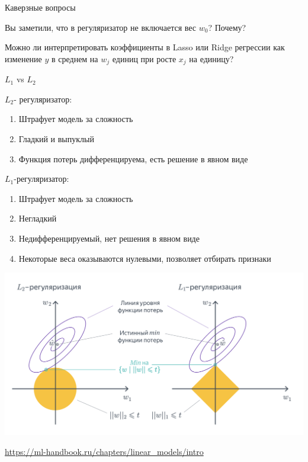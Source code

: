 \documentclass[notes,12pt, aspectratio=169]{beamer}
\newenvironment{wideitemize}{\itemize\addtolength{\itemsep}{10pt}}{\enditemize}
\begin{document}
\begin{frame}{Каверзные вопросы}
	\begin{wideitemize}
		\item  Вы заметили, что в регуляризатор не включается вес $w_0$? Почему? \pause 
		\item  Можно ли интерпретировать коэффициенты в Lasso или Ridge регрессии как изменение $y$ в среднем на $w_j$ единиц при росте $x_j$ на единицу? 
	\end{wideitemize}
\end{frame} 


\begin{frame}{$L_1$ vs $L_2$}
	\begin{wideitemize}
		\item $L_2$- регуляризатор: 
		\begin{enumerate}
			\item Штрафует модель за сложность
			\item Гладкий и выпуклый 
			\item Функция потерь дифференцируема, есть решение в явном виде
		\end{enumerate}
		
		\item $L_1$-регуляризатор:
		\begin{enumerate}
			\item Штрафует модель за сложность
			\item Негладкий
			\item Недифференцируемый, нет решения в явном виде
			\item Некоторые веса оказываются нулевыми, позволяет отбирать признаки
		\end{enumerate}
	\end{wideitemize}
\end{frame} 


\begin{frame}[plain]
	
	\begin{center}
		\includegraphics[width=0.87\paperwidth]{l1vsl2.png}
	\end{center}
\vfill
{\footnotesize
\color{blue}
\url{https://ml-handbook.ru/chapters/linear_models/intro}
}
\end{frame}
\end{document}
